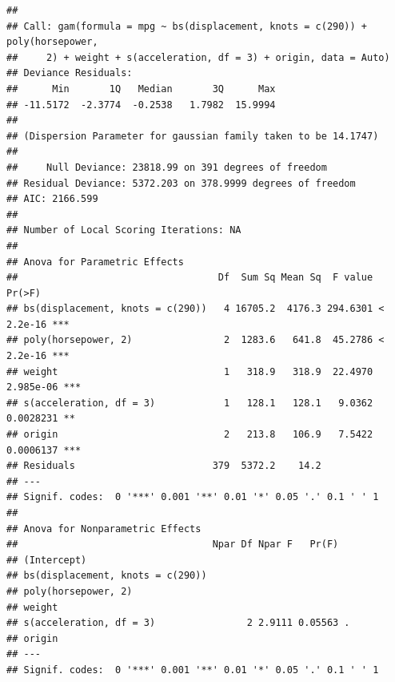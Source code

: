 \documentclass[
]{article}
\newenvironment{Shaded}{\begin{snugshade}}{\end{snugshade}}
\newcommand{\AttributeTok}[1]{\textcolor[rgb]{0.77,0.63,0.00}{#1}}
\newcommand{\CommentTok}[1]{\textcolor[rgb]{0.56,0.35,0.01}{\textit{#1}}}
\newcommand{\ConstantTok}[1]{\textcolor[rgb]{0.00,0.00,0.00}{#1}}
\newcommand{\DecValTok}[1]{\textcolor[rgb]{0.00,0.00,0.81}{#1}}
\newcommand{\FunctionTok}[1]{\textcolor[rgb]{0.00,0.00,0.00}{#1}}
\newcommand{\NormalTok}[1]{#1}
\newcommand{\OtherTok}[1]{\textcolor[rgb]{0.56,0.35,0.01}{#1}}
\newcommand{\SpecialCharTok}[1]{\textcolor[rgb]{0.00,0.00,0.00}{#1}}
\newcommand{\StringTok}[1]{\textcolor[rgb]{0.31,0.60,0.02}{#1}}
\begin{document}
\begin{Shaded}
\end{Shaded}

\begin{verbatim}
## 
## Call: gam(formula = mpg ~ bs(displacement, knots = c(290)) + poly(horsepower, 
##     2) + weight + s(acceleration, df = 3) + origin, data = Auto)
## Deviance Residuals:
##      Min       1Q   Median       3Q      Max 
## -11.5172  -2.3774  -0.2538   1.7982  15.9994 
## 
## (Dispersion Parameter for gaussian family taken to be 14.1747)
## 
##     Null Deviance: 23818.99 on 391 degrees of freedom
## Residual Deviance: 5372.203 on 378.9999 degrees of freedom
## AIC: 2166.599 
## 
## Number of Local Scoring Iterations: NA 
## 
## Anova for Parametric Effects
##                                   Df  Sum Sq Mean Sq  F value    Pr(>F)    
## bs(displacement, knots = c(290))   4 16705.2  4176.3 294.6301 < 2.2e-16 ***
## poly(horsepower, 2)                2  1283.6   641.8  45.2786 < 2.2e-16 ***
## weight                             1   318.9   318.9  22.4970 2.985e-06 ***
## s(acceleration, df = 3)            1   128.1   128.1   9.0362 0.0028231 ** 
## origin                             2   213.8   106.9   7.5422 0.0006137 ***
## Residuals                        379  5372.2    14.2                       
## ---
## Signif. codes:  0 '***' 0.001 '**' 0.01 '*' 0.05 '.' 0.1 ' ' 1
## 
## Anova for Nonparametric Effects
##                                  Npar Df Npar F   Pr(F)  
## (Intercept)                                              
## bs(displacement, knots = c(290))                         
## poly(horsepower, 2)                                      
## weight                                                   
## s(acceleration, df = 3)                2 2.9111 0.05563 .
## origin                                                   
## ---
## Signif. codes:  0 '***' 0.001 '**' 0.01 '*' 0.05 '.' 0.1 ' ' 1
\end{verbatim}
\end{document}
